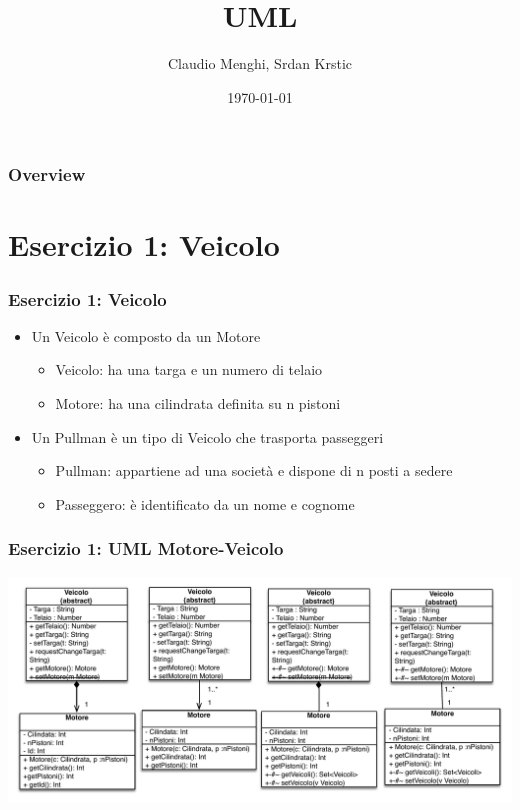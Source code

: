 \documentclass{beamer}
\title[Introduzione]{UML} %
\author{Claudio Menghi,  Srdan Krstic} %
\institute[Deepse group] %
{
Politecnico di Milano \\ %
\medskip
\textit{menghi@elet.polimi.it,  srdan.krstic@polimi.it} %
}
\date{\today} %
\begin{document}
\begin{frame}
\titlepage %
\end{frame}

\begin{frame}
\frametitle{Overview} %
\tableofcontents %
\end{frame}




\section{Esercizio 1: Veicolo}
\begin{frame}
\frametitle{Esercizio 1: Veicolo}
\begin{itemize}
\item Un Veicolo \`e composto da un Motore
\begin{itemize}
\item Veicolo: ha una targa e un numero di telaio
\item Motore: ha una cilindrata definita su n pistoni
\end{itemize}
\item  Un Pullman \`e un tipo di Veicolo che trasporta passeggeri
\begin{itemize}
\item Pullman: appartiene ad una societ\`a e dispone di n posti a sedere
\item Passeggero: \`e identificato da un nome e cognome
\end{itemize}
\end{itemize}
\end{frame}


\begin{frame}
\frametitle{Esercizio 1: UML Motore-Veicolo}
\includegraphics[scale=0.50]{Img/motoreveicolo.pdf}

\end{frame}
\end{document}
